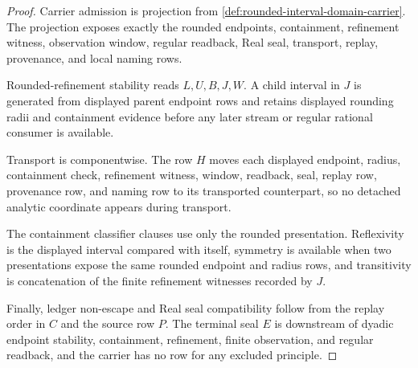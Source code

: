 \begin{proof}
Carrier admission is projection from \autoref{def:rounded-interval-domain-carrier}. The projection exposes exactly the rounded endpoints, containment, refinement witness, observation window, regular readback, Real seal, transport, replay, provenance, and local naming rows.

Rounded-refinement stability reads $L,U,B,J,W$. A child interval in $J$ is generated from displayed parent endpoint rows and retains displayed rounding radii and containment evidence before any later stream or regular rational consumer is available.

Transport is componentwise. The row $H$ moves each displayed endpoint, radius, containment check, refinement witness, window, readback, seal, replay row, provenance row, and naming row to its transported counterpart, so no detached analytic coordinate appears during transport.

The containment classifier clauses use only the rounded presentation. Reflexivity is the displayed interval compared with itself, symmetry is available when two presentations expose the same rounded endpoint and radius rows, and transitivity is concatenation of the finite refinement witnesses recorded by $J$.

Finally, ledger non-escape and Real seal compatibility follow from the replay order in $C$ and the source row $P$. The terminal seal $E$ is downstream of dyadic endpoint stability, containment, refinement, finite observation, and regular readback, and the carrier has no row for any excluded principle.
\end{proof}

